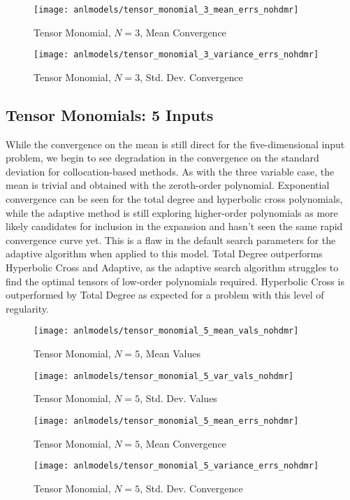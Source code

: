 \begin{figure}[H]
  \centering
  \texttt{[image: anlmodels/tensor\_monomial\_3\_mean\_errs\_nohdmr]}
  \caption{Tensor Monomial, $N=3$, Mean Convergence}
  \label{fig:tensormono mean errors 3}
\end{figure}
\begin{figure}[H]
  \centering
  \texttt{[image: anlmodels/tensor\_monomial\_3\_variance\_errs\_nohdmr]}
  \caption{Tensor Monomial, $N=3$, Std. Dev. Convergence}
  \label{fig:tensormono var errors 3}
\end{figure}

\subsection{Tensor Monomials: 5 Inputs}
While the convergence on the mean is still direct for the five-dimensional input problem, we begin to see
degradation in the convergence on the standard deviation for collocation-based methods.  
As with the three variable case, the mean is trivial and obtained with the zeroth-order polynomial.  
Exponential
convergence can be seen for the total degree and hyperbolic cross polynomials, while the adaptive
method
is still exploring higher-order polynomials as more likely candidates for inclusion in the expansion and hasn't
seen the same rapid convergence curve yet.  This is a flaw in the default search parameters for the adaptive
algorithm when applied to this model.
Total Degree outperforms Hyperbolic Cross and Adaptive, as
the adaptive search algorithm struggles to find the optimal tensors of low-order polynomials required.  Hyperbolic
Cross is outperformed by Total Degree as expected for a problem with this level of regularity.
\begin{figure}[H]
  \centering
  \texttt{[image: anlmodels/tensor\_monomial\_5\_mean\_vals\_nohdmr]}
  \caption{Tensor Monomial, $N=5$, Mean Values}
  \label{fig:tensormono mean values 5}
\end{figure}
\begin{figure}[H]
  \centering
  \texttt{[image: anlmodels/tensor\_monomial\_5\_var\_vals\_nohdmr]}
  \caption{Tensor Monomial, $N=5$, Std. Dev. Values}
  \label{fig:tensormono var values 5}
\end{figure}

\begin{figure}[H]
  \centering
  \texttt{[image: anlmodels/tensor\_monomial\_5\_mean\_errs\_nohdmr]}
  \caption{Tensor Monomial, $N=5$, Mean Convergence}
  \label{fig:tensormono mean errors 5}
\end{figure}
\begin{figure}[H]
  \centering
  \texttt{[image: anlmodels/tensor\_monomial\_5\_variance\_errs\_nohdmr]}
  \caption{Tensor Monomial, $N=5$, Std. Dev. Convergence}
  \label{fig:tensormono var errors 5}
\end{figure}

